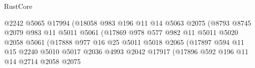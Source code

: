 \begin{lexlean}{RustCore}
\begin{coremodule}
                                      @2242
                                      @5065
                                      @17994
                                      (@18058
                                        @983
                                        @196
                                        @11
                                        @14
                                        @5063
                                        @2075
                                        (@8793
                                          @8745
                                          @2079
                                          @983
                                          @11
                                          @5011
                                          @5061
                                          (@17869
                                            @978
                                            @577
                                            @982
                                            @11
                                            @5011
                                            @5020
                                            @2058
                                            @5061
                                            (@17888
                                              @977
                                              @16
                                              @25
                                              @5011
                                              @5018
                                              @2065
                                              (@17897
                                                @594
                                                @11
                                                @15
                                                @2240
                                                @5010
                                                @5017
                                                @2036
                                                @4993
                                                @2042
                                                @17917
                                                (@17896
                                                  @592
                                                  @196
                                                  @11
                                                  @14
                                                  @2714
                                                  @2058
                                                  @2075

\end{coremodule}
\end{lexlean}
